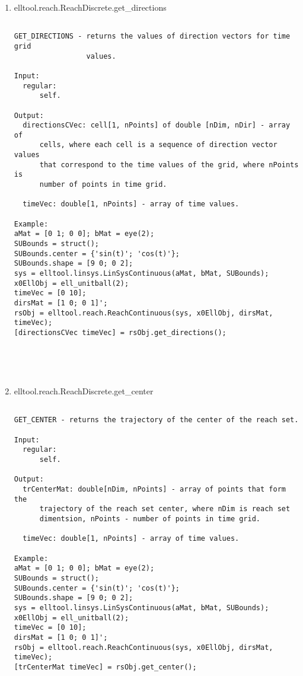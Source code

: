 \begin{enumerate}
\begin{lstlisting}
\end{lstlisting}
\fontfamily{\familydefault}
\selectfont
\item {elltool.reach.ReachDiscrete.get\_directions}
\selectfont
\begin{lstlisting}

GET_DIRECTIONS - returns the values of direction vectors for time grid
                 values.

Input:
  regular:
      self.

Output:
  directionsCVec: cell[1, nPoints] of double [nDim, nDir] - array of
      cells, where each cell is a sequence of direction vector values
      that correspond to the time values of the grid, where nPoints is
      number of points in time grid.

  timeVec: double[1, nPoints] - array of time values.

Example:
aMat = [0 1; 0 0]; bMat = eye(2);
SUBounds = struct();
SUBounds.center = {'sin(t)'; 'cos(t)'};
SUBounds.shape = [9 0; 0 2];
sys = elltool.linsys.LinSysContinuous(aMat, bMat, SUBounds);
x0EllObj = ell_unitball(2);
timeVec = [0 10];
dirsMat = [1 0; 0 1]';
rsObj = elltool.reach.ReachContinuous(sys, x0EllObj, dirsMat, timeVec);
[directionsCVec timeVec] = rsObj.get_directions();





\end{lstlisting}
\fontfamily{\familydefault}
\selectfont
\item {elltool.reach.ReachDiscrete.get\_center}
\selectfont
\begin{lstlisting}

GET_CENTER - returns the trajectory of the center of the reach set.

Input:
  regular:
      self.

Output:
  trCenterMat: double[nDim, nPoints] - array of points that form the
      trajectory of the reach set center, where nDim is reach set
      dimentsion, nPoints - number of points in time grid.

  timeVec: double[1, nPoints] - array of time values.

Example:
aMat = [0 1; 0 0]; bMat = eye(2);
SUBounds = struct();
SUBounds.center = {'sin(t)'; 'cos(t)'};
SUBounds.shape = [9 0; 0 2];
sys = elltool.linsys.LinSysContinuous(aMat, bMat, SUBounds);
x0EllObj = ell_unitball(2);
timeVec = [0 10];
dirsMat = [1 0; 0 1]';
rsObj = elltool.reach.ReachContinuous(sys, x0EllObj, dirsMat, timeVec);
[trCenterMat timeVec] = rsObj.get_center();






\end{lstlisting}
\end{enumerate}
